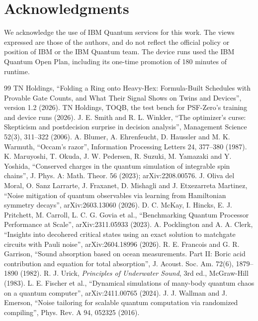 \documentclass[11pt]{article}
\begin{document}
\section*{Acknowledgments}
We acknowledge the use of IBM Quantum services for this work. The views expressed are those of the authors, and do
not reflect the official policy or position of IBM or the IBM Quantum team. The device runs used the IBM Quantum
Open Plan, including its one-time promotion of 180 minutes of runtime.

\begin{thebibliography}{99}
 TN Holdings, ``Folding a Ring onto Heavy-Hex: Formula-Built Schedules with Provable Gate Counts, and
What Their Signal Shows on Twins and Devices'', version 1.2 (2026).
 TN Holdings, TOQB, the test bench for PSF-Zero's training and device runs (2026).
 J. E. Smith and R. L. Winkler, ``The optimizer's curse: Skepticism and postdecision surprise in
decision analysis'', Management Science 52(3), 311--322 (2006).
 A. Blumer, A. Ehrenfeucht, D. Haussler and M. K. Warmuth, ``Occam's razor'', Information Processing
Letters 24, 377--380 (1987).
 K. Maruyoshi, T. Okuda, J. W. Pedersen, R. Suzuki, M. Yamazaki and Y. Yoshida, ``Conserved
charges in the quantum simulation of integrable spin chains'', J. Phys. A: Math. Theor. 56 (2023);
arXiv:2208.00576.
 J. Oliva del Moral, O. Sanz Larrarte, J. Fraxanet, D. Mishagli and J. Etxezarreta Martinez,
``Noise mitigation of quantum observables via learning from Hamiltonian symmetry decays'', arXiv:2603.13060 (2026).
 D. C. McKay, I. Hincks, E. J. Pritchett, M. Carroll, L. C. G. Govia et al., ``Benchmarking
Quantum Processor Performance at Scale'', arXiv:2311.05933 (2023).
 A. Pocklington and A. A. Clerk, ``Insights into decohered critical states using an exact
solution to matchgate circuits with Pauli noise'', arXiv:2604.18996 (2026).
 R. E. Francois and G. R. Garrison, ``Sound absorption based on ocean measurements. Part II:
Boric acid contribution and equation for total absorption'', J. Acoust. Soc. Am. 72(6), 1879--1890 (1982).
 R. J. Urick, \emph{Principles of Underwater Sound}, 3rd ed., McGraw-Hill (1983).
 L. E. Fischer et al., ``Dynamical simulations of many-body quantum chaos on a quantum
computer'', arXiv:2411.00765 (2024).
 J. J. Wallman and J. Emerson, ``Noise tailoring for scalable quantum computation via randomized
compiling'', Phys. Rev. A 94, 052325 (2016).
\end{thebibliography}
\end{document}
